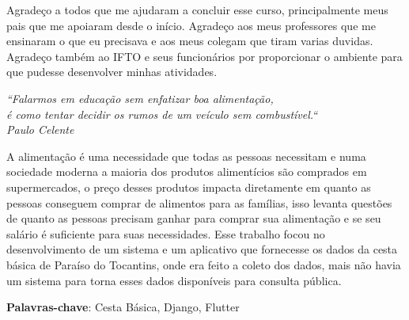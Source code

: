 \documentclass{ifto-tex}
\begin{document}
\begin{agradecimentos}
Agradeço a todos que me ajudaram a concluir esse curso, principalmente meus pais que me apoiaram desde o início. Agradeço aos meus professores que me ensinaram o que eu precisava e aos meus colegam que tiram varias duvidas. Agradeço também ao IFTO e seus funcionários por proporcionar o ambiente para que pudesse desenvolver minhas atividades.
\end{agradecimentos}


\begin{epigrafe}
	\vspace*{\fill}
	\begin{flushright}
		\textit{
			``Falarmos em educação sem enfatizar boa alimentação,\\ é como tentar decidir os rumos de um veículo sem combustível.``\\
			Paulo Celente
		}
	\end{flushright}
\end{epigrafe}


\setlength{\absparsep}{18pt} %

\begin{resumo}
	A alimentação é uma necessidade que todas as pessoas necessitam e numa sociedade moderna a maioria dos produtos alimentícios são comprados em supermercados, o preço desses produtos impacta diretamente em quanto as pessoas conseguem comprar de alimentos para as famílias, isso levanta questões de quanto as pessoas precisam ganhar para comprar sua alimentação e se seu salário é suficiente para suas necessidades. Esse trabalho focou no desenvolvimento de um sistema e um aplicativo que fornecesse os dados da cesta básica de Paraíso do Tocantins, onde era feito a coleto dos dados, mais não havia um sistema para torna esses dados disponíveis para consulta pública.
	
	\textbf{Palavras-chave}: Cesta Básica, Django, Flutter
\end{resumo}
\end{document}
